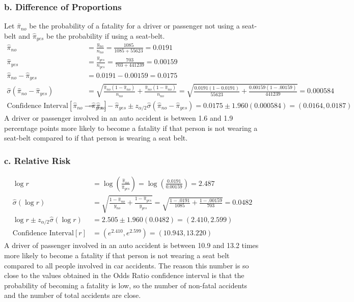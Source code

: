 \documentclass{article}
\begin{document}
\subsubsection*{b. Difference of Proportions}
Let $\hat\pi_{no}$ be the probability of a fatality for a driver or passenger not using a seat-belt and $\hat\pi_{yes}$ be the probability if using a seat-belt.
\begin{align*}
\hat\pi_{no} &= \frac{y_{no}}{n_{no}} = \frac{1085}{1085+55623} =  0.0191 \\
\hat\pi_{yes} &= \frac{y_{yes}}{n_{yes}} = \frac{703}{703+441239} = 0.00159 \\
\hat\pi_{no} - \hat\pi_{yes} &= 0.0191 - 0.00159 = 0.0175 \\
\hat\sigma\left(\hat\pi_{no} - \hat\pi_{yes}\right) &=  \sqrt{\frac{\hat\pi_{no}(1-\hat\pi_{no})}{n_{no}} + \frac{\hat\pi_{no}(1-\hat\pi_{no})}{n_{no}}} = \sqrt{\frac{0.0191(1-0.0191)}{55623}+\frac{0.00159(1-.00159)}{441239}} = 0.000584 \\
\text{Confidence Interval}[\hat\pi_{no} - \hat\pi_{yes}] &= \hat\pi_{no} - \hat\pi_{yes} \pm z_{\alpha/2}\hat\sigma\left(\hat\pi_{no} - \hat\pi_{yes}\right) = 0.0175 \pm 1.960(0.000584) = (0.0164, 0.0187)
\end{align*}
A driver or passenger involved in an auto accident is between 1.6 and 1.9 percentage points more likely to become a fatality if that person is not wearing a seat-belt compared to if that person is wearing a seat belt.
\subsubsection*{c. Relative Risk}
\begin{align*}
\log r &= \log\left(\frac{\hat\pi_{no}}{\hat\pi_{yes}}\right) = \log\left(\frac{0.0191}{0.00159}\right) = 2.487 \\
\hat\sigma\left(\log r\right) &= \sqrt{\frac{1-\hat\pi_{no}}{y_{no}} + \frac{1-\hat\pi_{yes}}{y_{yes}}} = \sqrt{\frac{1-.0191}{1085}+\frac{1-.00159}{703}} = 0.0482 \\
\log r \pm z_{\alpha/2}\hat\sigma\left(\log r\right) &= 2.505 \pm 1.960 (0.0482) = (2.410, 2.599) \\
\text{Confidence Interval}[r] &= (e^{2.410}, e^{2.599}) = (10.943, 13.220)
\end{align*}
A driver of passenger involved in an auto accident is between 10.9 and 13.2 times more likely to become a fatality if that person is not wearing a seat belt compared to all people involved in car accidents. The reason this number is so close to the values obtained in the Odds Ratio confidence interval is that the probability of becoming a fatality is low, so the number of non-fatal accidents and the number of total accidents are close. 
\end{document}
